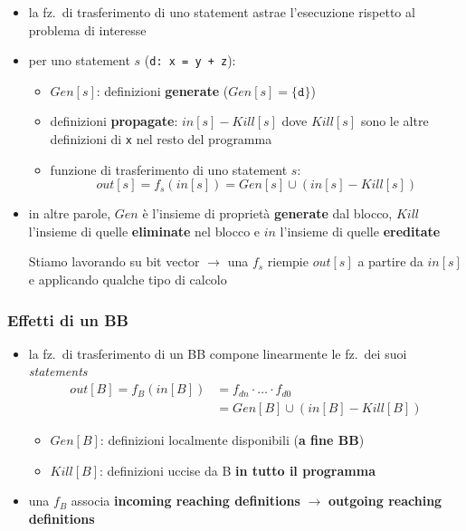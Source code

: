 \begin{itemize}
  \item la fz.~di trasferimento di uno statement astrae l'esecuzione rispetto al problema di interesse
  \item per uno statement $s$ (\lstinline|d: x = y + z|):
  \begin{itemize}
    \item $Gen[s]$: definizioni \textbf{generate} ($Gen[s] = \lbrace\texttt{d}\rbrace$)
    \item definizioni \textbf{propagate}: $in[s] - Kill[s]$ dove $Kill[s]$ sono le altre definizioni di \lstinline|x| nel resto del programma
    \item funzione di trasferimento di uno statement $s$:
    \begin{equation*}
      out[s] = f_{s}(in[s]) = Gen[s] \cup (in[s] - Kill[s]) 
    \end{equation*}
    
  \end{itemize}
  
  \item in altre parole, $Gen$ \`e l'insieme di propriet\`a \textbf{generate} dal blocco, $Kill$ l'insieme di quelle \textbf{eliminate} nel blocco e $in$ l'insieme di quelle \textbf{ereditate}
  \begin{emphasize}
      Stiamo lavorando su bit vector $\rightarrow$ una $f_{s}$ riempie $out[s]$ a partire da $in[s]$ e applicando qualche tipo di calcolo
  \end{emphasize}
\end{itemize}

\vspace{-2em}
\subsubsection{Effetti di un BB}

\begin{itemize}
  \item la fz.~di trasferimento di un BB compone linearmente le fz.~dei suoi \textit{statements}
    \begin{equation*}
      \begin{split}
        \boxed{out[B]} = f_{B}(in[B]) &= f_{dn}\cdot\ldots\cdot f_{d0} \\
                                      &= \boxed{Gen[B] \cup (in[B] - Kill[B])}
      \end{split}
    \end{equation*}
    \begin{itemize}
      \item $Gen[B]$: definizioni localmente disponibili (\textbf{a fine BB})
      \item $Kill[B]$: definizioni uccise da B \textbf{in tutto il programma}
    \end{itemize}
  \item una $f_{B}$ associa \textbf{incoming reaching definitions} $\rightarrow$ \textbf{outgoing reaching definitions}
\end{itemize}


